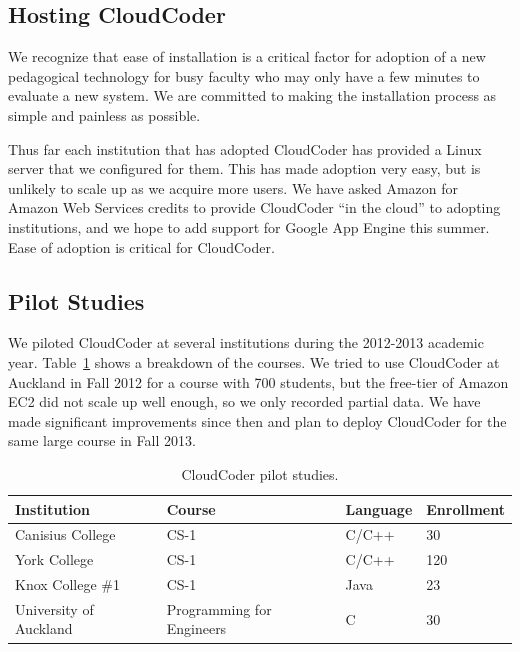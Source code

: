 \documentclass{sig-alternate}
\begin{document}


\subsection{Hosting CloudCoder}
We recognize that ease of installation is a critical factor for
adoption of a new pedagogical
technology for busy
faculty who may only have a few minutes to evaluate a new system.  We
are committed to making the installation process as simple and painless as 
possible.

Thus far each institution that has adopted CloudCoder has
provided a Linux server that we configured for them.  This has made
adoption very easy, but is unlikely to scale up as we acquire more
users.  We have asked Amazon for Amazon Web Services credits to
provide CloudCoder ``in the cloud'' to adopting institutions, and we
hope to add support for Google App Engine this summer.  Ease of
adoption is critical for CloudCoder.

\subsection{Pilot Studies}

We piloted CloudCoder at several institutions during the 2012-2013
academic year.  Table~\ref{tab:courses} shows a breakdown of the
courses.  We tried to use CloudCoder at Auckland in Fall 2012 for a
course with 700 students, but the free-tier of Amazon EC2 did not
scale up well enough, so we only recorded partial data.  We have made
significant improvements since then and plan to deploy CloudCoder for
the same large course in Fall 2013.


\begin{table}
\centering
\begin{tabular}{| l | l | l | l |}
\hline
Institution & Course & Language & Enrollment\\
\hline
Canisius College & CS-1 & C/C++ & 30\\
York College & CS-1 & C/C++ & 120\\
Knox College \#1 & CS-1 & Java & 23\\
University of Auckland & Programming for Engineers & C & 30\\
\hline
\end{tabular}
\caption{CloudCoder pilot studies.}
\label{tab:courses}
\end{table}
\end{document}
